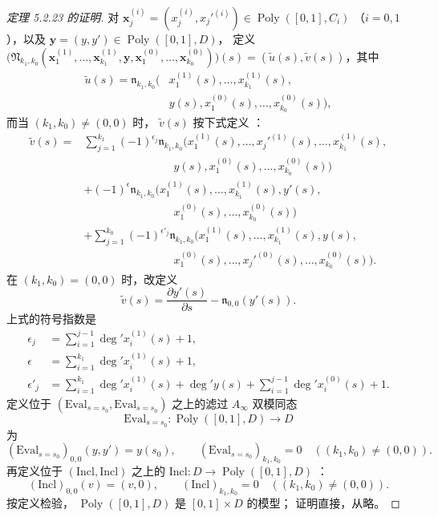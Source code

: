 \begin{proof}[定理 5.2.23 的证明]
对
$\mathbf x_j^{(i)}
=(x_j^{(i)},x_j'^{(i)})
\in\operatorname{Poly}([0,1],C_i)$
（$i=0,1$），以及
$\mathbf y=(y,y')\in\operatorname{Poly}([0,1],D)$，
定义 $\bigl(\mathfrak N_{k_1,k_0}
(\mathbf x_1^{(1)},\ldots,\mathbf x_{k_1}^{(1)},
\mathbf y,\mathbf x_1^{(0)},\ldots,
\mathbf x_{k_0}^{(0)})\bigr)(s)
=(\widetilde u(s),\widetilde v(s))$，其中
\[
\begin{aligned}
\widetilde u(s)=
\mathfrak n_{k_1,k_0}\bigl(
&x_1^{(1)}(s),\ldots,x_{k_1}^{(1)}(s),\\
&y(s),x_1^{(0)}(s),\ldots,x_{k_0}^{(0)}(s)
\bigr),
\end{aligned}
\]
而当 $(k_1,k_0)\ne(0,0)$ 时，
$\widetilde v(s)$ 按下式定义
：
\[
\begin{aligned}
\widetilde v(s)={}&
\sum_{j=1}^{k_1}(-1)^{\epsilon_j}
\mathfrak n_{k_1,k_0}\bigl(
x_1^{(1)}(s),\ldots,x_j'^{(1)}(s),
\ldots,x_{k_1}^{(1)}(s),\\
&\hspace{8em}y(s),x_1^{(0)}(s),
\ldots,x_{k_0}^{(0)}(s)\bigr)\\
&+(-1)^\epsilon
\mathfrak n_{k_1,k_0}\bigl(
x_1^{(1)}(s),\ldots,x_{k_1}^{(1)}(s),
y'(s),\\
&\hspace{8em}x_1^{(0)}(s),\ldots,
x_{k_0}^{(0)}(s)\bigr)\\
&+\sum_{j=1}^{k_0}(-1)^{\epsilon'_j}
\mathfrak n_{k_1,k_0}\bigl(
x_1^{(1)}(s),\ldots,x_{k_1}^{(1)}(s),
y(s),\\
&\hspace{8em}x_1^{(0)}(s),\ldots,
x_j'^{(0)}(s),\ldots,
x_{k_0}^{(0)}(s)\bigr).
\end{aligned}
\]
在 $(k_1,k_0)=(0,0)$ 时，改定义
\[
\widetilde v(s)
=\frac{\partial y'(s)}{\partial s}
-\mathfrak n_{0,0}(y'(s)).
\]
上式的符号指数是
\[
\begin{aligned}
\epsilon_j
&=\sum_{i=1}^{j-1}\deg' x_i^{(1)}(s)+1,\\
\epsilon
&=\sum_{i=1}^{k_1}\deg' x_i^{(1)}(s)+1,\\
\epsilon'_j
&=\sum_{i=1}^{k_1}\deg' x_i^{(1)}(s)
+\deg' y(s)
+\sum_{i=1}^{j-1}\deg' x_i^{(0)}(s)+1.
\end{aligned}
\]
定义位于
$(\mathrm{Eval}_{s=s_0},\mathrm{Eval}_{s=s_0})$
之上的滤过 $A_\infty$ 双模同态
\[
\mathrm{Eval}_{s=s_0}:
\operatorname{Poly}([0,1],D)\longrightarrow D
\]
为
\[
(\mathrm{Eval}_{s=s_0})_{0,0}(y,y')=y(s_0),
\qquad
(\mathrm{Eval}_{s=s_0})_{k_1,k_0}=0
\quad((k_1,k_0)\ne(0,0)).
\]
再定义位于 $(\mathrm{Incl},\mathrm{Incl})$
之上的
$\mathrm{Incl}:D\to\operatorname{Poly}([0,1],D)$
：
\[
(\mathrm{Incl})_{0,0}(v)=(v,0),
\qquad
(\mathrm{Incl})_{k_1,k_0}=0
\quad((k_1,k_0)\ne(0,0)).
\]
按定义检验，
$\operatorname{Poly}([0,1],D)$
是 $[0,1]\times D$ 的模型；
证明直接，从略。


\end{proof}
